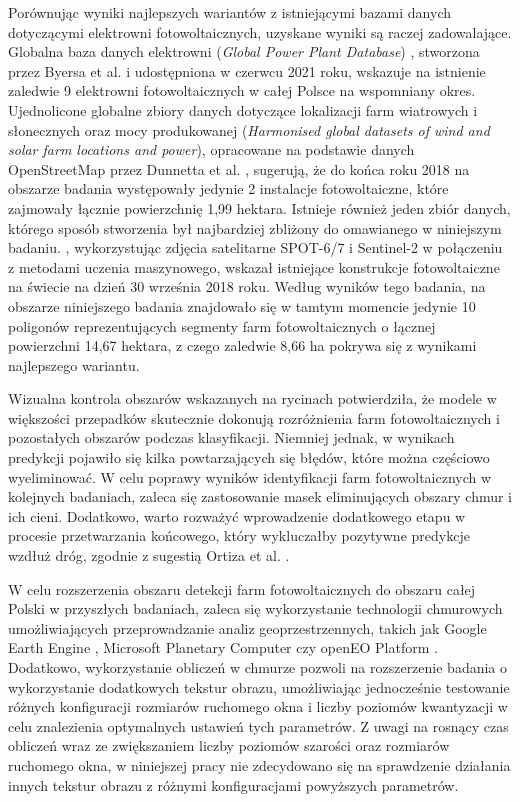 \documentclass{amuthesis}
\begin{document}
Porównując wyniki najlepszych wariantów z istniejącymi bazami danych
dotyczącymi elektrowni fotowoltaicznych, uzyskane wyniki są raczej
zadowalające. Globalna baza danych elektrowni (\emph{Global Power Plant
Database}) \autocite{globalpowerplantdb_2021}, stworzona przez Byersa et
al. \autocite*{byers_2018_globalpowerplantdb} i udostępniona w czerwcu
2021 roku, wskazuje na istnienie zaledwie 9 elektrowni fotowoltaicznych
w całej Polsce na wspomniany okres. Ujednolicone globalne zbiory danych
dotyczące lokalizacji farm wiatrowych i słonecznych oraz mocy
produkowanej (\emph{Harmonised global datasets of wind and solar farm
locations and power}), opracowane na podstawie danych OpenStreetMap
przez Dunnetta et al. \autocite*{dunnet_2020_wind_solar}, sugerują, że
do końca roku 2018 na obszarze badania występowały jedynie 2 instalacje
fotowoltaiczne, które zajmowały łącznie powierzchnię 1,99 hektara.
Istnieje również jeden zbiór danych, którego sposób stworzenia był
najbardziej zbliżony do omawianego w niniejszym badaniu.
\textcite{kruitwagen_2021_pv}, wykorzystując zdjęcia satelitarne
SPOT-6/7 i Sentinel-2 w połączeniu z metodami uczenia maszynowego,
wskazał istniejące konstrukcje fotowoltaiczne na świecie na dzień 30
września 2018 roku. Według wyników tego badania, na obszarze niniejszego
badania znajdowało się w tamtym momencie jedynie 10 poligonów
reprezentujących segmenty farm fotowoltaicznych o łącznej powierzchni
14,67 hektara, z czego zaledwie 8,66 ha pokrywa się z wynikami
najlepszego wariantu.

Wizualna kontrola obszarów wskazanych na rycinach potwierdziła, że
modele w większości przepadków skutecznie dokonują rozróżnienia farm
fotowoltaicznych i pozostałych obszarów podczas klasyfikacji. Niemniej
jednak, w wynikach predykcji pojawiło się kilka powtarzających się
błędów, które można częściowo wyeliminować. W celu poprawy wyników
identyfikacji farm fotowoltaicznych w kolejnych badaniach, zaleca się
zastosowanie masek eliminujących obszary chmur i ich cieni. Dodatkowo,
warto rozważyć wprowadzenie dodatkowego etapu w procesie przetwarzania
końcowego, który wykluczałby pozytywne predykcje wzdłuż dróg, zgodnie z
sugestią Ortiza et al. \autocite*{ortiz_2022_pv}.

W celu rozszerzenia obszaru detekcji farm fotowoltaicznych do obszaru
całej Polski w przyszłych badaniach, zaleca się wykorzystanie
technologii chmurowych umożliwiających przeprowadzanie analiz
geoprzestrzennych, takich jak Google Earth Engine
\autocite{gorelick_2017_gee}, Microsoft Planetary Computer
\autocite{microsoft_planetary_computer} czy openEO Platform
\autocite{openEO_platform}. Dodatkowo, wykorzystanie obliczeń w chmurze
pozwoli na rozszerzenie badania o wykorzystanie dodatkowych tekstur
obrazu, umożliwiając jednocześnie testowanie różnych konfiguracji
rozmiarów ruchomego okna i liczby poziomów kwantyzacji w celu
znalezienia optymalnych ustawień tych parametrów. Z uwagi na rosnący
czas obliczeń wraz ze zwiększaniem liczby poziomów szarości oraz
rozmiarów ruchomego okna, w niniejszej pracy nie zdecydowano się na
sprawdzenie działania innych tekstur obrazu z różnymi konfiguracjami
powyższych parametrów.

\printbibliography[heading=bibintoc, title=Bibliografia]
\end{document}
